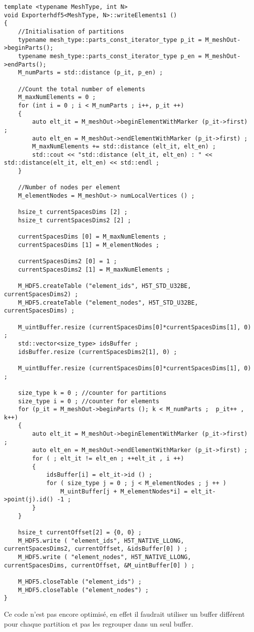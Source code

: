 \documentclass[12pt]{article}
\begin{document}
\begin{lstlisting}
template <typename MeshType, int N>
void Exporterhdf5<MeshType, N>::writeElements1 ()
{
    //Initialisation of partitions
    typename mesh_type::parts_const_iterator_type p_it = M_meshOut->beginParts();
    typename mesh_type::parts_const_iterator_type p_en = M_meshOut->endParts();
    M_numParts = std::distance (p_it, p_en) ;

    //Count the total number of elements
    M_maxNumElements = 0 ;
    for (int i = 0 ; i < M_numParts ; i++, p_it ++) 
    {
        auto elt_it = M_meshOut->beginElementWithMarker (p_it->first) ;
        auto elt_en = M_meshOut->endElementWithMarker (p_it->first) ;
        M_maxNumElements += std::distance (elt_it, elt_en) ;
        std::cout << "std::distance (elt_it, elt_en) : " << std::distance(elt_it, elt_en) << std::endl ;
    }

    //Number of nodes per element
    M_elementNodes = M_meshOut-> numLocalVertices () ;

    hsize_t currentSpacesDims [2] ;
    hsize_t currentSpacesDims2 [2] ;

    currentSpacesDims [0] = M_maxNumElements ;
    currentSpacesDims [1] = M_elementNodes ;

    currentSpacesDims2 [0] = 1 ;
    currentSpacesDims2 [1] = M_maxNumElements ;

    M_HDF5.createTable ("element_ids", H5T_STD_U32BE, currentSpacesDims2) ;
    M_HDF5.createTable ("element_nodes", H5T_STD_U32BE, currentSpacesDims) ;

    M_uintBuffer.resize (currentSpacesDims[0]*currentSpacesDims[1], 0) ;
    std::vector<size_type> idsBuffer ;
    idsBuffer.resize (currentSpacesDims2[1], 0) ;

    M_uintBuffer.resize (currentSpacesDims[0]*currentSpacesDims[1], 0) ;

    size_type k = 0 ; //counter for partitions
    size_type i = 0 ; //counter for elements
    for (p_it = M_meshOut->beginParts (); k < M_numParts ;  p_it++ , k++)
    {
        auto elt_it = M_meshOut->beginElementWithMarker (p_it->first) ;
        auto elt_en = M_meshOut->endElementWithMarker (p_it->first) ;
        for ( ; elt_it != elt_en ; ++elt_it , i ++)
        {
            idsBuffer[i] = elt_it->id () ;
            for ( size_type j = 0 ; j < M_elementNodes ; j ++ )
                M_uintBuffer[j + M_elementNodes*i] = elt_it->point(j).id() -1 ; 
        }
    }

    hsize_t currentOffset[2] = {0, 0} ;
    M_HDF5.write ( "element_ids", H5T_NATIVE_LLONG, currentSpacesDims2, currentOffset, &idsBuffer[0] ) ;
    M_HDF5.write ( "element_nodes", H5T_NATIVE_LLONG, currentSpacesDims, currentOffset, &M_uintBuffer[0] ) ;

    M_HDF5.closeTable ("element_ids") ;
    M_HDF5.closeTable ("element_nodes") ;
}
\end{lstlisting}
Ce code n'est pas encore optimisé, en effet il faudrait utiliser un buffer différent pour chaque partition et pas les regrouper dans un seul buffer.
\end{document}
